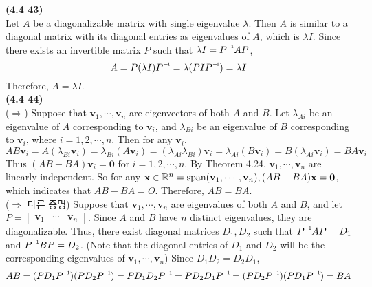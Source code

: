 \textbf{(4.4 43)} \\
Let $A$ be a diagonalizable matrix with single eigenvalue $\lambda$. Then $A$ is similar to a diagonal matrix with its diagonal entries as eigenvalues of $A$, which is $\lambda I$. Since there exists an invertible matrix $P$ such that $\lambda I = \inv{P}AP$, \begin{equation*}
	A = P(\lambda I)\inv{P} = \lambda(PI\inv{P}) = \lambda I
\end{equation*} Therefore, $A = \lambda I$. \\

\textbf{(4.4 44)} \\
($\Rightarrow$) Suppose that $\textbf{v}_1, \cdots, \textbf{v}_n$ are eigenvectors of both $A$ and $B$. Let $\lambda_{Ai}$ be an eigenvalue of $A$ corresponding to $\textbf{v}_i$, and $\lambda_{Bi}$ be an eigenvalue of $B$ corresponding to $\textbf{v}_i$, where $i = 1, 2, \cdots, n$. Then for any $\textbf{v}_i$, \begin{equation*}
	AB\textbf{v}_i = A(\lambda_{Bi}\textbf{v}_i) = \lambda_{Bi}(A\textbf{v}_i) = (\lambda_{Ai}\lambda_{Bi})\textbf{v}_i = \lambda_{Ai}(B\textbf{v}_i) = B(\lambda_{Ai}\textbf{v}_i) = BA\textbf{v}_i
\end{equation*} Thus $(AB - BA)\textbf{v}_i = \textbf{0}$  for $i = 1, 2, \cdots, n$. By Theorem 4.24, $\textbf{v}_1, \cdots, \textbf{v}_n$ are linearly independent. So for any $\textbf{x} \in \mathbb{R}^{n} = \textnormal{span}(\textbf{v}_1, \cdots, \textbf{v}_n), (AB - BA)\textbf{x} = \textbf{0}$, which indicates that $AB - BA = O$. Therefore, $AB = BA$. \\

($\Rightarrow$ 다른 증명) Suppose that $\textbf{v}_1, \cdots, \textbf{v}_n$ are eigenvalues of both $A$ and $B$, and let $P = \begin{bmatrix}
	\textbf{v}_1 & \cdots & \textbf{v}_n
\end{bmatrix}$. Since $A$ and $B$ have $n$ distinct eigenvalues, they are diagonalizable. Thus, there exist diagonal matrices $D_1, D_2$ such that $\inv{P}AP = D_1$ and $\inv{P}BP = D_2$. (Note that the diagonal entries of $D_1$ and $D_2$ will be the corresponding eigenvalues of $\textbf{v}_1, \cdots, \textbf{v}_n$) Since $D_1D_2 = D_2D_1$, \begin{equation*}
	AB = (PD_1\inv{P})(PD_2\inv{P}) = PD_1D_2\inv{P} = PD_2D_1\inv{P} = (PD_2\inv{P})(PD_1\inv{P}) = BA
\end{equation*}

